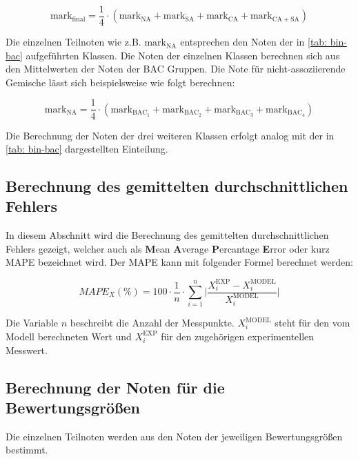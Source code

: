 \documentclass[../thesis.tex]{subfiles}
\begin{document}
\begin{equation}
	\mathrm{mark}_{\mathrm{final}} = \dfrac{1}{4} \cdot \left( 
		\mathrm{mark}_{\mathrm{NA}} + \mathrm{mark}_{\mathrm{SA}} + \mathrm{mark}_{\mathrm{CA}} + \mathrm{mark}_{\mathrm{CA + SA}} 
	 \right)
	 \label{eq: mark_final}
\end{equation}

Die einzelnen Teilnoten wie z.B. $\mathrm{mark}_{\mathrm{NA}}$ entsprechen den Noten der in \autoref{tab: bin-bac} aufgeführten Klassen. Die Noten der einzelnen Klassen berechnen sich aus den Mittelwerten der Noten der BAC Gruppen. Die Note für nicht-assoziierende Gemische lässt sich beispielsweise wie folgt berechnen:

\begin{equation}
	\mathrm{mark}_{\mathrm{NA}} = \dfrac{1}{4} \cdot \left(
		\mathrm{mark}_{\mathrm{BAC_1}} + \mathrm{mark}_{\mathrm{BAC_2}} + \mathrm{mark}_{\mathrm{BAC_3}} + \mathrm{mark}_{\mathrm{BAC_4}}
	\right)
\end{equation}

Die Berechnung der Noten der drei weiteren Klassen erfolgt analog mit der in \autoref{tab: bin-bac} dargestellten Einteilung.

\subsection{Berechnung des gemittelten durchschnittlichen Fehlers}
In diesem Abschnitt wird die Berechnung des gemittelten durchschnittlichen Fehlers gezeigt, welcher auch als \textbf{M}ean \textbf{A}verage \textbf{P}ercantage \textbf{E}rror oder kurz MAPE bezeichnet wird. Der MAPE kann mit folgender Formel berechnet werden:

\begin{equation}
	MAPE_X(\%) = 100 \cdot \dfrac{1}{n} \cdot \sum_{i=1}^{n} \biggl| \dfrac{X_i^\mathrm{EXP} - X_i^\mathrm{MODEL}}{X_i^\mathrm{MODEL}} \biggr|
	\label{MAPE Glg}
\end{equation}

Die Variable $n$ beschreibt die Anzahl der Messpunkte. $X_i^\mathrm{MODEL}$ steht für den vom Modell berechneten Wert und $X_i^\mathrm{EXP}$ für den zugehörigen experimentellen Messwert.

\subsection{Berechnung der Noten für die Bewertungsgrößen}
Die einzelnen Teilnoten werden aus den Noten der jeweiligen Bewertungsgrößen bestimmt.
\\
\end{document}
